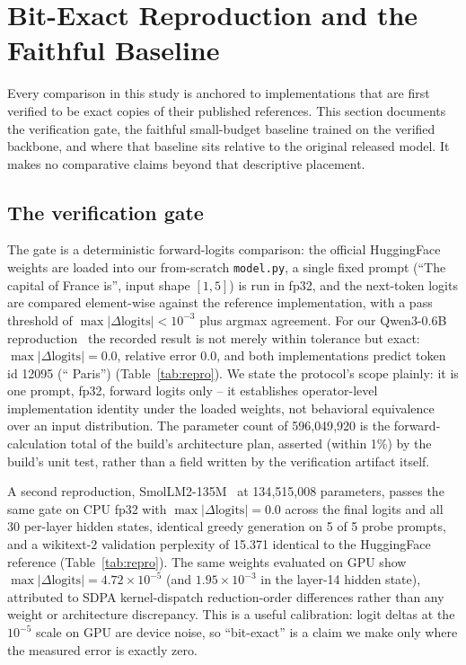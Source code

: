 \section{Bit-Exact Reproduction and the Faithful Baseline}\label{sec:repro}

Every comparison in this study is anchored to implementations that are first
verified to be exact copies of their published references. This section
documents the verification gate, the faithful small-budget baseline trained on
the verified backbone, and where that baseline sits relative to the original
released model. It makes no comparative claims beyond that descriptive
placement.

\subsection{The verification gate}

The gate is a deterministic forward-logits comparison: the official
HuggingFace weights are loaded into our from-scratch \texttt{model.py}, a
single fixed prompt (``The capital of France is'', input shape $[1,5]$) is run
in fp32, and the next-token logits are compared element-wise against the
reference implementation, with a pass threshold of
$\max|\Delta\text{logits}| < 10^{-3}$ plus argmax agreement. For our
Qwen3-0.6B reproduction~\citep{yang2025qwen3} the recorded result is not
merely within tolerance but exact: $\max|\Delta\text{logits}| = 0.0$, relative
error $0.0$, and both implementations predict token id 12095 (`` Paris'')
(Table~\ref{tab:repro}). We state the protocol's scope plainly: it is one
prompt, fp32, forward logits only -- it establishes operator-level
implementation identity under the loaded weights, not behavioral equivalence
over an input distribution. The parameter count of 596{,}049{,}920 is the
forward-calculation total of the build's architecture plan, asserted (within
1\%) by the build's unit test, rather than a field written by the verification
artifact itself.



A second reproduction, SmolLM2-135M~\citep{allal2025smollm2} at
134{,}515{,}008 parameters, passes the same gate on CPU fp32 with
$\max|\Delta\text{logits}| = 0.0$ across the final logits and all 30 per-layer
hidden states, identical greedy generation on 5 of 5 probe prompts, and a
wikitext-2 validation perplexity of 15.371 identical to the HuggingFace
reference (Table~\ref{tab:repro}). The same weights evaluated on GPU show
$\max|\Delta\text{logits}| = 4.72\times10^{-5}$ (and $1.95\times10^{-3}$ in
the layer-14 hidden state), attributed to SDPA kernel-dispatch
reduction-order differences rather than any weight or architecture
discrepancy. This is a useful calibration: logit deltas at the
$10^{-5}$ scale on GPU are device noise, so ``bit-exact'' is a claim we make
only where the measured error is exactly zero.


